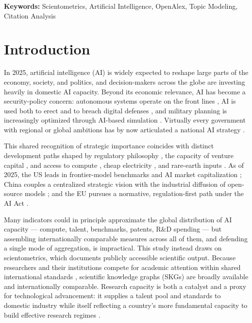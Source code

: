\documentclass{article}
\let\cite\parencite
\begin{document}
	\vspace{1em}
	
	\begin{center}
		\textbf{Keywords:} Scientometrics, Artificial Intelligence, OpenAlex, Topic Modeling, Citation Analysis
	\end{center}
	
	\vspace{1em}
	
	\setcounter{page}{1}
	
	\twocolumn
	
	\section{Introduction}
	
	In 2025, artificial intelligence (AI) is widely expected to reshape large parts of the economy, society, and politics, and decision-makers across the globe are investing heavily in domestic AI capacity. Beyond its economic relevance, AI has become a security-policy concern: autonomous systems operate on the front lines \cite{onderco2025aifrontierNATO}, AI is used both to erect and to breach digital defenses \cite{salem2024aicybersecurityreview, vance2023geopolitical}, and military planning is increasingly optimized through AI-based simulation \cite{basuchoudhary2025aiwarfare}. Virtually every government with regional or global ambitions has by now articulated a national AI strategy \cite{sabouri2024newgeopolitics}.
	
	This shared recognition of strategic importance coincides with distinct development paths shaped by regulatory philosophy \cite{wang2025artificial}, the capacity of venture capital \cite{montanaro2024venture}, and access to compute \cite{lehdonvirta2025compute}, cheap electricity \cite{lin2024exploding}, and rare-earth inputs \cite{fan2023geopolitics}. As of 2025, the US leads in frontier-model benchmarks and AI market capitalization \cite{sastry2024computing}; China couples a centralized strategic vision with the industrial diffusion of open-source models \cite{khanal2024development}; and the EU pursues a normative, regulation-first path under the AI Act \cite{balcioglu2025turning}.
	
	Many indicators could in principle approximate the global distribution of AI capacity --- compute, talent, benchmarks, patents, R\&D spending \cite{ozkaya2023analysis} --- but assembling internationally comparable measures across all of them, and defending a single mode of aggregation, is impractical. This study instead draws on scientometrics, which documents publicly accessible scientific output. Because researchers and their institutions compete for academic attention within shared international standards \cite{machacek2021globalization}, scientific knowledge graphs (SKGs) are broadly available and internationally comparable. Research capacity is both a catalyst and a proxy for technological advancement: it supplies a talent pool and standards to domestic industry \cite{brekke2021university} while itself reflecting a country's more fundamental capacity to build effective research regimes \cite{szczygielski2024mutual}.
	
\end{document}
